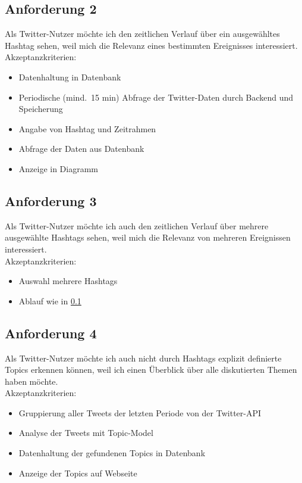 \documentclass[conference]{IEEEtran}
\begin{document}
\subsection{Anforderung 2}
\label{2}
Als Twitter-Nutzer möchte ich den zeitlichen Verlauf über ein ausgewähltes Hashtag sehen,
weil mich die Relevanz eines bestimmten Ereignisses interessiert.
\\
Akzeptanzkriterien:
\begin{itemize}
        \item Datenhaltung in Datenbank
        \item Periodische (mind.\ 15 min) Abfrage der Twitter-Daten durch Backend und Speicherung
        \item Angabe von Hashtag und Zeitrahmen
        \item Abfrage der Daten aus Datenbank
        \item Anzeige in Diagramm
\end{itemize}

\subsection{Anforderung 3}
Als Twitter-Nutzer möchte ich auch den zeitlichen Verlauf über mehrere ausgewählte Hashtags sehen,
weil mich die Relevanz von mehreren Ereignissen interessiert.
\\
Akzeptanzkriterien:
\begin{itemize}
        \item Auswahl mehrere Hashtags
        \item Ablauf wie in \ref*{2}
\end{itemize}

\subsection{Anforderung 4}
Als Twitter-Nutzer möchte ich auch nicht durch Hashtags explizit definierte Topics erkennen können,
weil ich einen Überblick über alle diskutierten Themen haben möchte.
\\
Akzeptanzkriterien:
\begin{itemize}
        \item Gruppierung aller Tweets der letzten Periode von der Twitter-API
        \item Analyse der Tweets mit Topic-Model
        \item Datenhaltung der gefundenen Topics in Datenbank
        \item Anzeige der Topics auf Webseite
\end{itemize}
\end{document}
